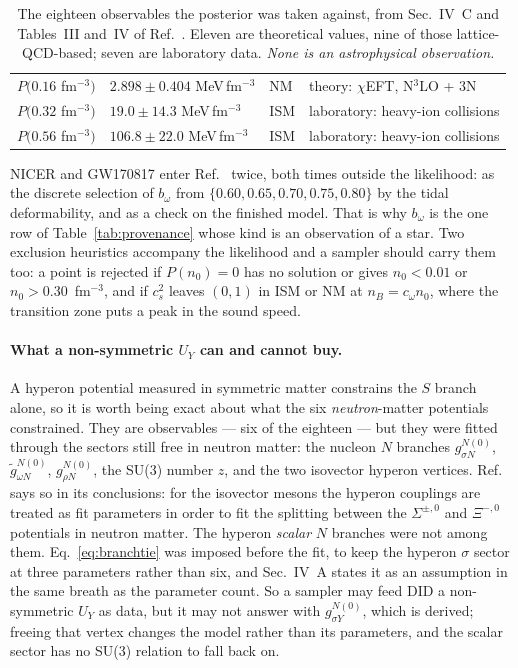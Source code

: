 \documentclass[aps,prc,onecolumn,superscriptaddress,nofootinbib,10pt]{revtex4-2}
\newcommand{\nB}{n_B}
\newcommand{\nzero}{n_0}
\begin{document}
\begin{table}[h]
\begin{tabular}{@{}llll@{}}
$P(0.16$ fm$^{-3})$ & $2.898 \pm 0.404$ MeV\,fm$^{-3}$ & NM & theory: $\chi$EFT, N$^3$LO + 3N \\
$P(0.32$ fm$^{-3})$ & $19.0 \pm 14.3$ MeV\,fm$^{-3}$ & ISM & laboratory: heavy-ion collisions \\
$P(0.56$ fm$^{-3})$ & $106.8 \pm 22.0$ MeV\,fm$^{-3}$ & ISM & laboratory: heavy-ion collisions \\
\bottomrule
\end{tabular}
\caption{The eighteen observables the posterior was taken against, from
Sec.~IV~C and Tables~III and~IV of Ref.~\cite{Frohaug2025}. Eleven are
theoretical values, nine of those lattice-QCD-based; seven are laboratory data.
\emph{None is an astrophysical observation.}}
\label{tab:evidence}
\end{table}

NICER and GW170817 enter Ref.~\cite{Frohaug2025} twice, both times outside the
likelihood: as the discrete selection of $b_\omega$ from
$\{0.60, 0.65, 0.70, 0.75, 0.80\}$ by the tidal deformability, and as a check on
the finished model. That is why $b_\omega$ is the one row of
Table~\ref{tab:provenance} whose kind is an observation of a star. Two exclusion
heuristics accompany the likelihood and a sampler should carry them too: a point
is rejected if $P(\nzero) = 0$ has no solution or gives $\nzero < 0.01$ or
$\nzero > 0.30$~fm$^{-3}$, and if $c_s^2$ leaves $(0,1)$ in ISM or NM at
$\nB = c_\omega \nzero$, where the transition zone puts a peak in the sound
speed.

\paragraph{What a non-symmetric $U_Y$ can and cannot buy.} A hyperon potential
measured in symmetric matter constrains the $S$ branch alone, so it is worth
being exact about what the six \emph{neutron}-matter potentials constrained.
They are observables --- six of the eighteen --- but they were fitted through
the sectors still free in neutron matter: the nucleon $N$ branches
$g^{N(0)}_{\sigma N}$, $\tilde{g}^{N(0)}_{\omega N}$, $g^{N(0)}_{\rho N}$, the
SU(3) number $z$, and the two isovector hyperon vertices. Ref.~\cite{Frohaug2025}
says so in its conclusions: for the isovector mesons the hyperon couplings are
treated as fit parameters in order to fit the splitting between the
$\Sigma^{\pm,0}$ and $\Xi^{-,0}$ potentials in neutron matter. The hyperon
\emph{scalar} $N$ branches were not among them. Eq.~\eqref{eq:branchtie} was
imposed before the fit, to keep the hyperon $\sigma$ sector at three parameters
rather than six, and Sec.~IV~A states it as an assumption in the same breath as
the parameter count. So a sampler may feed DID a non-symmetric $U_Y$ as data,
but it may not answer with $g^{N(0)}_{\sigma Y}$, which is derived; freeing that
vertex changes the model rather than its parameters, and the scalar sector has
no SU(3) relation to fall back on.
\end{document}
